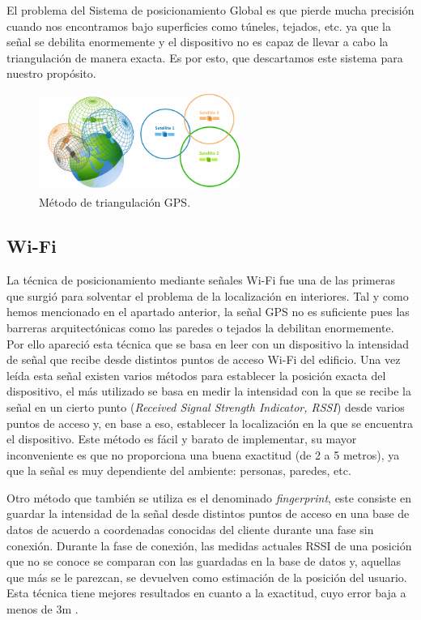 El problema del Sistema de posicionamiento Global es que pierde mucha precisión cuando nos encontramos bajo superficies como túneles, tejados, etc. ya que la señal se debilita enormemente y el dispositivo no es capaz de llevar a cabo la triangulación de manera exacta. Es por esto, que descartamos este sistema para nuestro propósito.

\begin{figure}[t]
	\centering
	\includegraphics[width=0.6\textwidth]{Imagenes/Estadodelacuestion/triangulacion}
	\caption{Método de triangulación GPS. }
	\label{fig:ejemplogps}
\end{figure}


\subsection{Wi-Fi}

La técnica de posicionamiento mediante señales Wi-Fi fue una de las primeras que surgió para solventar el problema de la localización en interiores. Tal y como hemos mencionado en el apartado anterior, la señal GPS no es suficiente pues las barreras arquitectónicas como las paredes o tejados la debilitan enormemente. Por ello apareció esta técnica que se basa en leer con un dispositivo la intensidad de señal que recibe desde distintos puntos de acceso Wi-Fi del edificio. Una vez leída esta señal existen varios métodos para establecer la posición exacta del dispositivo, el más utilizado se basa en medir la intensidad con la que se recibe la señal en un cierto punto (\textit{Received Signal Strength Indicator, RSSI}) desde varios puntos de acceso y, en base a eso, establecer la localización en la que se encuentra el dispositivo. Este método es fácil y barato de implementar, su mayor inconveniente es que no proporciona una buena exactitud (de 2 a 5 metros), ya que la señal es muy dependiente del ambiente: personas, paredes, etc.

Otro método que también se utiliza es el denominado \textit{fingerprint}, este consiste en guardar la intensidad de la señal desde distintos puntos de acceso en una base de datos de acuerdo a coordenadas conocidas del cliente durante una fase sin conexión. Durante la fase de conexión, las medidas actuales RSSI de una posición que no se conoce se comparan con las guardadas en la base de datos y, aquellas que más se le parezcan, se devuelven como estimación de la posición del usuario. Esta técnica tiene mejores resultados en cuanto a la exactitud, cuyo error baja a menos de 3m \citep{wifipositioning}. 

